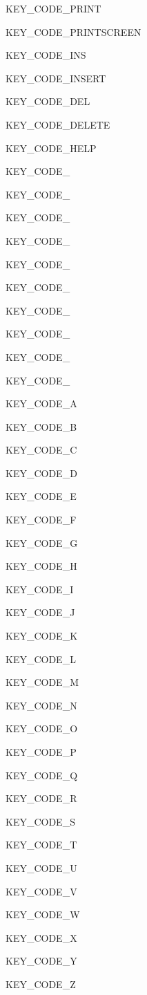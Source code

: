  KEY\_\-CODE\_\-PRINT \par
 KEY\_\-CODE\_\-PRINTSCREEN \par
 KEY\_\-CODE\_\-INS \par
 KEY\_\-CODE\_\-INSERT \par
 KEY\_\-CODE\_\-DEL \par
 KEY\_\-CODE\_\-DELETE \par
 KEY\_\-CODE\_\-HELP \par
 \par
 KEY\_\-CODE\_ \par
 KEY\_\-CODE\_ \par
 KEY\_\-CODE\_ \par
 KEY\_\-CODE\_ \par
 KEY\_\-CODE\_ \par
 KEY\_\-CODE\_ \par
 KEY\_\-CODE\_ \par
 KEY\_\-CODE\_ \par
 KEY\_\-CODE\_ \par
 KEY\_\-CODE\_ \par
 \par
 KEY\_\-CODE\_\-A \par
 KEY\_\-CODE\_\-B \par
 KEY\_\-CODE\_\-C \par
 KEY\_\-CODE\_\-D \par
 KEY\_\-CODE\_\-E \par
 KEY\_\-CODE\_\-F \par
 KEY\_\-CODE\_\-G \par
 KEY\_\-CODE\_\-H \par
 KEY\_\-CODE\_\-I \par
 KEY\_\-CODE\_\-J \par
 KEY\_\-CODE\_\-K \par
 KEY\_\-CODE\_\-L \par
 KEY\_\-CODE\_\-M \par
 KEY\_\-CODE\_\-N \par
 KEY\_\-CODE\_\-O \par
 KEY\_\-CODE\_\-P \par
 KEY\_\-CODE\_\-Q \par
 KEY\_\-CODE\_\-R \par
 KEY\_\-CODE\_\-S \par
 KEY\_\-CODE\_\-T \par
 KEY\_\-CODE\_\-U \par
 KEY\_\-CODE\_\-V \par
 KEY\_\-CODE\_\-W \par
 KEY\_\-CODE\_\-X \par
 KEY\_\-CODE\_\-Y \par
 KEY\_\-CODE\_\-Z \par


